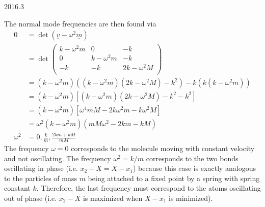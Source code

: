 \documentclass[12pt]{article}
\begin{document}
\begin{solution}{2016.3}
\begin{enumerate}
The normal mode frequencies are then found via
\begin{align*}
0 & = \det ( \underline{v} - \omega^2 \underline{m} ) \\
& = \det \left( \begin{array}{ccc}
k - \omega^2 m & 0 & -k \\
0 & k - \omega^2 m & -k \\
-k & -k & 2k - \omega^2 M \\
\end{array} \right) \\
& = (k - \omega^2 m) ((k - \omega^2 m) (2k - \omega^2 M) - k^2) - k(k(k - \omega^2 m)) \\
& = (k - \omega^2 m) \left[ (k - \omega^2 m) (2k - \omega^2 M) - k^2 - k^2 \right] \\
& = (k - \omega^2 m) \left[ \omega^4 m M - 2k \omega^2 m - k \omega^2 M \right] \\
& = \omega^2 (k - \omega^2 m) (m M \omega^2 - 2km - kM) \\
\omega^2 & = 0, \frac{k}{m}, \frac{2km + kM}{mM}
\end{align*}
The frequency $\omega = 0$ corresponds to the molecule moving with constant velocity and not oscillating.
The frequency $\omega^2 = k/m$ corresponds to the two bonds oscillating in phase (i.e. $x_2 - X = X - x_1$) because this case is exactly analogous to the particles of mass $m$ being attached to a fixed point by a spring with spring constant $k$.
Therefore, the last frequency must correspond to the atoms oscillating out of phase (i.e. $x_2 - X$ is maximized when $X - x_1$ is minimized).

\end{enumerate}

\end{solution}
\end{document}
